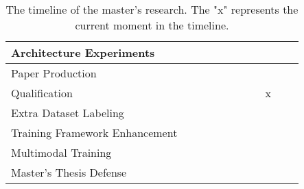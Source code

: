 \begin{table}[h]
\begin{tabular}{lllllllllll}
Architecture Experiments                              &                          &                          &                          &                          &                          & \cellcolor[HTML]{96FFFB} & \cellcolor[HTML]{96FFFB} &                                              &                                              &                          \\ \hline
Paper Production                                      &                          &                          &                          &                          &                          &                          &                          & \cellcolor[HTML]{96FFFB}                     &                                              &                          \\ \hline
Qualification                                         &                          &                          &                          &                          &                          &                          & \multicolumn{1}{c}{}     & \multicolumn{1}{c}{\cellcolor[HTML]{FD6864}x} &  &                          \\ \hline
Extra Dataset Labeling                                &                          &                          &                          &                          &                          &                          &                          &                                  \cellcolor[HTML]{FFFFC7}             & \cellcolor[HTML]{FFFFC7}                     &     \cellcolor[HTML]{FFFFC7}                     \\ \hline
Training Framework Enhancement                        &                          &                          &                          &                          &                          &                          &                          &                               \cellcolor[HTML]{FFFC9E}                & \cellcolor[HTML]{FFFC9E}                     & \cellcolor[HTML]{FFFC9E} \\ \hline
Multimodal Training                        &                          &                          &                          &                          &                          &                          &                          &                                           & \cellcolor[HTML]{FFFC9E}                     & \cellcolor[HTML]{FFFC9E} \\ \hline
Master’s Thesis Defense                               &                          &                          &                          &                          &                          &                          &                          &                                              &                                              & \cellcolor[HTML]{FD6864} \\ \hline
\end{tabular}
\caption{The timeline of the master's research. The "x" represents the current moment in the timeline.}
\end{table}